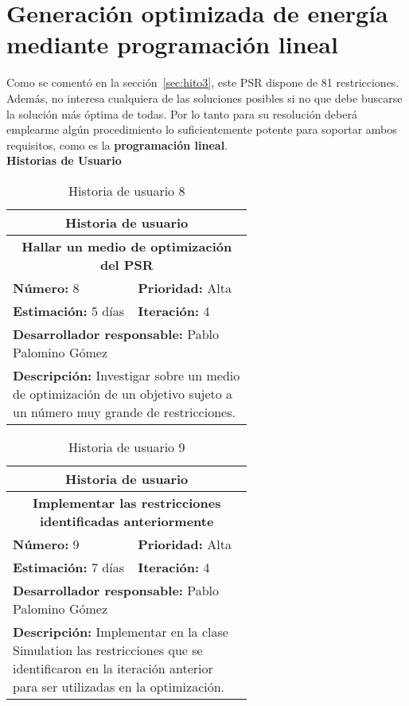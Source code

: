 \section{Generación optimizada de energía mediante programación lineal}
\label{sec:hito4}
Como se comentó en la sección~\ref{sec:hito3}, este \gls{PSR} dispone de 81 restricciones. Además, no interesa cualquiera de las soluciones posibles si no que debe buscarse la solución más óptima de todas. Por lo tanto para su resolución deberá emplearme algún procedimiento lo suficientemente potente para soportar ambos requisitos, como es la \textbf{programación lineal}.\\

\textbf{Historias de Usuario}\\

\begin{table}[H]
        \centering
        \begin{tabular}{|p{0.3\linewidth}|p{0.3\linewidth}|}
          \hline
          \multicolumn{2}{|c|}{Historia de usuario}\\ \hline
          \multicolumn{2}{|c|}{\textbf{Hallar un medio de optimización del PSR}}\\ \hline
          \textbf{Número:} 8 & \textbf{Prioridad:} Alta\\ \hline
          \textbf{Estimación:} 5 días & \textbf{Iteración:} 4\\ \hline
          \multicolumn{2}{|l|}{\textbf{Desarrollador responsable:} Pablo Palomino Gómez}\\ \hline
          \multicolumn{2}{|p{0.6\linewidth}|}{\textbf{Descripción:} Investigar sobre un medio de optimización de un objetivo sujeto a un número muy grande de restricciones.}\\ \hline
        \end{tabular}
        \caption{Historia de usuario 8}
        \label{tab:hist8}
\end{table}
\begin{table}[H]
        \centering
        \begin{tabular}{|p{0.3\linewidth}|p{0.3\linewidth}|}
          \hline
          \multicolumn{2}{|c|}{Historia de usuario}\\ \hline
          \multicolumn{2}{|c|}{\textbf{Implementar las restricciones identificadas anteriormente}}\\ \hline
          \textbf{Número:} 9 & \textbf{Prioridad:} Alta\\ \hline
          \textbf{Estimación:} 7 días & \textbf{Iteración:} 4\\ \hline
          \multicolumn{2}{|l|}{\textbf{Desarrollador responsable:} Pablo Palomino Gómez}\\ \hline
          \multicolumn{2}{|p{0.6\linewidth}|}{\textbf{Descripción:} Implementar en la clase Simulation las restricciones que se identificaron en la iteración anterior para ser utilizadas en la optimización.}\\ \hline
        \end{tabular}
        \caption{Historia de usuario 9}
        \label{tab:hist9}
\end{table}
